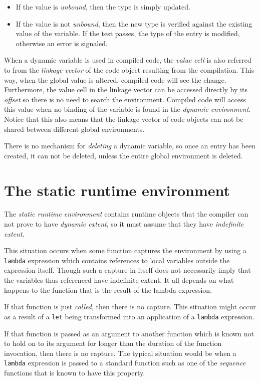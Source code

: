 \begin{itemize}
\item If the value is \emph{unbound}, then the type is simply
  updated.  
\item If the value is not \emph{unbound}, then the new type is
  verified against the existing value of the variable.  If the test
  passes, the type of the entry is modified, otherwise an error is
  signaled. 
\end{itemize}

When a dynamic variable is used in compiled code, the \emph{value
  cell} is also referred to from the \emph{linkage vector} of the code
object resulting from the compilation.  This way, when the global
value is altered, compiled code will see the change.  Furthermore, the
value cell in the linkage vector can be accessed directly by its
\emph{offset} so there is no need to search the environment.  Compiled
code will access this value when no binding of the variable is found
in the \emph{dynamic environment}.  Notice that this also means that
the linkage vector of code objects can not be shared between different
global environments.

There is no mechanism for \emph{deleting} a dynamic variable, so once
an entry has been created, it can not be deleted, unless the entire
global environment is deleted. 

\section{The static runtime environment}
\label{sec-environments-static-runtime}

The \emph{static runtime environment} contains runtime objects that
the compiler can not prove to have \emph{dynamic extent}, so it must
assume that they have \emph{indefinite extent}.  

This situation occurs when some function captures the environment by
using a \texttt{lambda} expression which contains references to local
variables outside the expression itself.  Though such a capture in
itself does not necessarily imply that the variables thus referenced
have indefinite extent.  It all depends on what happens to the
function that is the result of the lambda expression.  

If that function is just \emph{called}, then there is no capture.  This
situation might occur as a result of a \texttt{let} being transformed
into an application of a \texttt{lambda} expression.  

If that function is passed as an argument to another function which is
known not to hold on to its argument for longer than the duration of
the function invocation, then there is no capture.  The typical
situation would be when a \texttt{lambda} expression is passed to a
standard \cl{} function such as one of the \emph{sequence} functions
that is known to have this property.  

